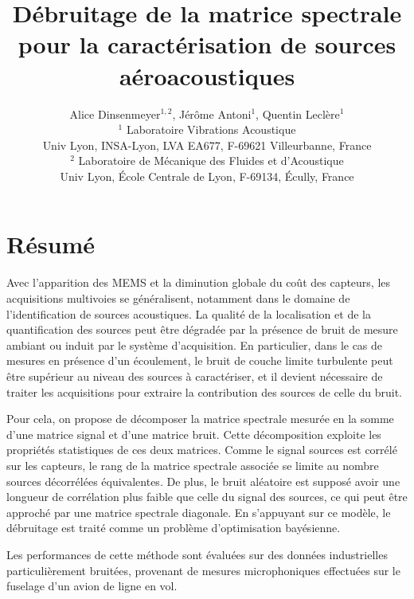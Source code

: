 \documentclass[12pt]{article}
\title{ 
\textbf{Débruitage de la matrice spectrale pour la caractérisation de sources aéroacoustiques}} %
\author{
 \normalsize{Alice Dinsenmeyer$^{1,2}$, Jérôme Antoni$^1$, Quentin Leclère$^1$}\\[-0.4em]
 \small{$^1$ Laboratoire Vibrations Acoustique}\\[-0.4em]
 \small{Univ Lyon, INSA-Lyon, LVA EA677, F-69621 Villeurbanne, France}\\[-0.4em]
 \small{$^2$ Laboratoire de Mécanique des Fluides et d’Acoustique }\\[-0.4em]
 \small{Univ Lyon, École Centrale de Lyon, F-69134, Écully, France}
\date{}
}
\date{}
\begin{document}
\maketitle %

\thispagestyle{fancy} %

\section*{Résumé}


Avec l'apparition des MEMS et la diminution globale du coût des capteurs, les acquisitions multivoies se généralisent, notamment dans le domaine de l'identification de sources acoustiques. La qualité de la localisation et de la quantification des sources peut être dégradée par la présence de bruit de mesure ambiant ou induit par le système d'acquisition. En particulier, dans le cas de mesures en présence d'un écoulement, le bruit de couche limite turbulente peut être supérieur au niveau des sources à caractériser, et il devient nécessaire de traiter les acquisitions pour extraire la contribution des sources de celle du bruit.

 Pour cela, on propose de décomposer la matrice spectrale mesurée en la somme d'une matrice signal et d'une matrice bruit. Cette décomposition exploite les propriétés statistiques de ces deux matrices. Comme le signal sources est corrélé sur les capteurs, le rang de la matrice spectrale associée se limite au nombre sources décorrélées équivalentes. De plus, le bruit aléatoire est supposé avoir une longueur de corrélation plus faible que celle du signal des sources, ce qui peut être approché par une matrice spectrale diagonale. En s'appuyant sur ce modèle, le débruitage est traité comme un problème d'optimisation bayésienne. 
 
Les performances de cette méthode sont évaluées sur des données industrielles particulièrement bruitées, provenant de mesures microphoniques effectuées sur le fuselage d'un avion de ligne en vol.
\end{document}
